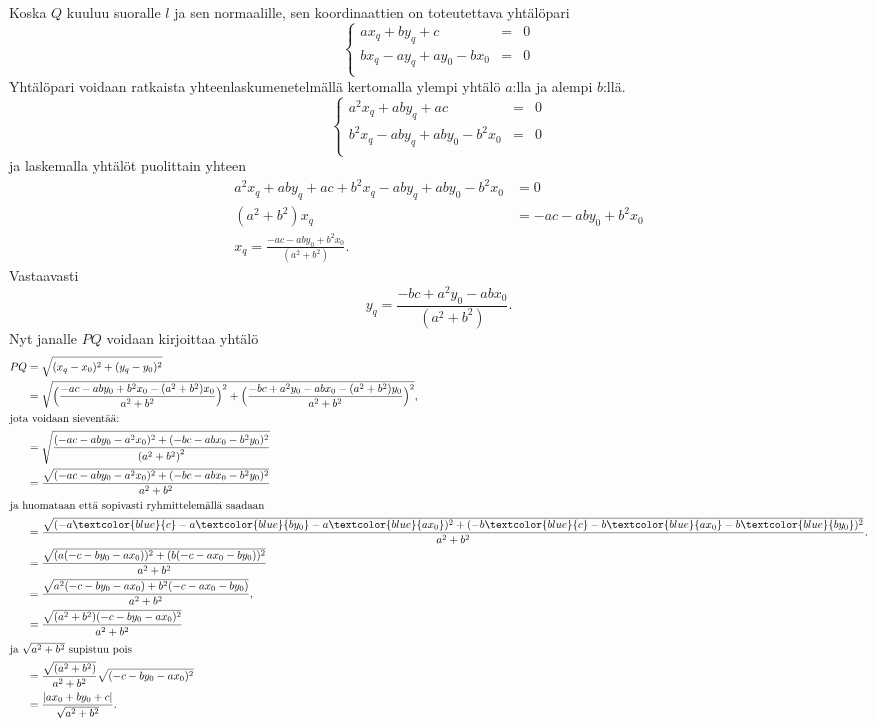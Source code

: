 Koska $Q$ kuuluu suoralle $l$ ja sen normaalille, sen koordinaattien on toteutettava yhtälöpari
\[
\left\{    
    \begin{array}{rcl}
        ax_q + by_q + c &=&0 \\
        bx_q-ay_q+ay_0-bx_0 &=& 0 \\
    \end{array}
    \right.
\]
Yhtälöpari voidaan ratkaista yhteenlaskumenetelmällä kertomalla ylempi yhtälö $a$:lla ja alempi $b$:llä.
\[
\left\{    
    \begin{array}{rcl}
        a^2x_q + aby_q + ac &=&0 \\
        b^2x_q-aby_q+aby_0-b^2x_0 &=& 0 \\
    \end{array}
    \right.
\]
ja laskemalla yhtälöt puolittain yhteen
\begin{align*}
 a^2x_q + aby_q + ac + b^2x_q-aby_q+aby_0-b^2x_0 &= 0 \\
 (a^2+b^2)x_q &= -ac-aby_0+b^2x_0 \\
 x_q = \frac{-ac-aby_0+b^2x_0}{(a^2+b^2)}.
\end{align*}
Vastaavasti
\[
y_q = \frac{-bc+a^2y_0-abx_0}{(a^2+b^2)}.
\]
Nyt janalle $PQ$ voidaan kirjoittaa yhtälö
\begin{align*}
  PQ &= \sqrt{(x_q-x_0)^2+(y_q-y_0)^2} \\
  &= \sqrt{\Big(\frac{-ac-aby_0+b^2x_0-(a^2+b^2)x_0}{a^2+b^2}\Big)^2+\Big(\frac{-bc+a^2y_0-abx_0-(a^2+b^2)y_0}{a^2+b^2}\Big)^2}, \\
  \intertext{jota voidaan sieventää:}
  & = \sqrt{\frac{(-ac-aby_0-a^2x_0)^2+(-bc-abx_0-b^2 y_0)^2}{\left(a^2+b^2\right)^2}} \\
  & = \frac{\sqrt{(-ac-aby_0-a^2x_0)^2+(-bc-abx_0-b^2 y_0)^2}}{a^2+b^2} \\
  \intertext{ja huomataan että sopivasti ryhmittelemällä saadaan} 
  & = \frac{\sqrt{(-a\textcolor{blue}{c}-a\textcolor{blue}{by_0}-a\textcolor{blue}{ax_0})^2+
  (-b\textcolor{blue}{c}-b\textcolor{blue}{ax_0}-b\textcolor{blue}{by_0})^2}}{a^2+b^2}. \\
  & = \frac{\sqrt{(a(-c-by_0-ax_0))^2+(b(-c-ax_0-by_0))^2}}{a^2+b^2} \\
  & = \frac{\sqrt{a^2(-c-by_0-ax_0)+b^2(-c-ax_0-by_0)}}{a^2+b^2}, \\
  & = \frac{\sqrt{(a^2+b^2)(-c-by_0-ax_0)^2}}{a^2+b^2} \\
  \intertext{ja  $\sqrt{a^2 + b^2}$ supistuu pois}
  & = \frac{\sqrt{(a^2+b^2)}}{a^2+b^2}\sqrt{(-c-by_0-ax_0)^2} \\
  & = \frac{|ax_0+by_0+c|}{\sqrt{a^2+b^2}}.
\end{align*}
